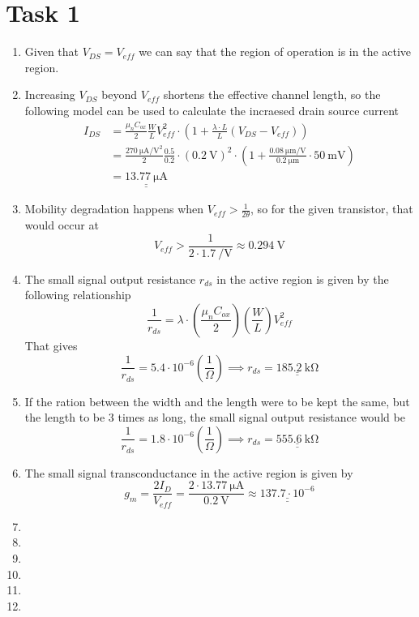 \documentclass[a4paper,11pt,norsk]{article}
\begin{document}


\section*{Task 1}
\begin{enumerate}
\item Given that $V_{DS} = V_{eff}$ we can say that the region of operation is 
    in the active region.
\item Increasing $V_{DS}$ beyond $V_{eff}$ shortens the effective channel length, so the following 
    model can be used to calculate the incraesed drain source current
    \begin{align*}
        I_{DS} &= \frac{\mu_n C_{ox}}{2} \frac{W}{L} V_{eff}^2 \cdot (1 + \frac{\lambda \cdot L}{L} (V_{DS} - V_{eff})) \\
               &= \frac{\SI{270}{\micro\ampere\per\volt\squared}}{2} \frac{0.5}{0.2} \cdot (\SI{0.2}{\volt})^2 \cdot \left(1 + \frac{\SI{0.08}{\micro\meter\per\volt}}{\SI{0.2}{\micro\meter}} \cdot \SI{50}{\milli\volt}\right) \\
               &= \underline{\underline{\SI{13.77}{\micro\ampere}}}
    \end{align*}
\item Mobility degradation happens when $V_{eff} > \frac{1}{2\theta}$, so for the given transistor, that would 
    occur at 
    \[
        V_{eff} > \frac{1}{2 \cdot \SI{1.7}{\per\volt}} \approx \SI{0.294}{\volt}
    \]
\item The small signal output resistance $r_{ds}$ in the active region is given by the following relationship
    \[
        \frac{1}{r_{ds}} = \lambda \cdot \left(\frac{\mu_n C_{ox}}{2}\right)\left(\frac{W}{L}\right) V_{eff}^2
    \]
    That gives 
    \[
    \frac{1}{r_{ds}} = 5.4 \cdot 10^{-6} \left(\frac{1}{\Omega}\right) \implies r_{ds} = \underline{\underline{\SI{185.2}{\kilo\ohm}}}
    \]
\item If the ration between the width and the length were to be kept the same, but the length to be 3 times as long, the 
    small signal output resistance would be
    \[
        \frac{1}{r_{ds}} = 1.8 \cdot 10^{-6} \left(\frac{1}{\Omega}\right) \implies r_{ds} = \underline{\underline{\SI{555.6}{\kilo\ohm}}}
    \]
\item The small signal transconductance in the active region is given by
    \[
        g_m = \frac{2 I_D}{V_{eff}} = \frac{2 \cdot \SI{13.77}{\micro\ampere}}{\SI{0.2}{\volt}} \approx \underline{\underline{137.7 \cdot 10^{-6}}}
    \]
\item 
\item 
\item 
\item 
\item 
\item 
\end{enumerate}
\end{document}
